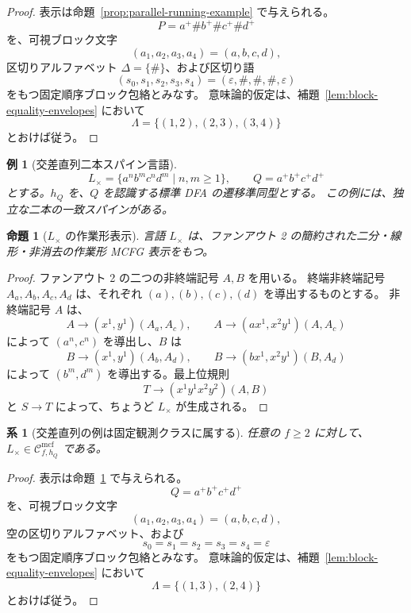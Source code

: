 \documentclass[11pt,a4paper]{ltjsarticle}
\newtheorem{proposition}[theorem]{命題}
\newtheorem{corollary}[theorem]{系}
\newtheorem{example}[theorem]{例}
\theoremstyle{remark}
\newcommand{\Cmcf}[2]{\mathcal{C}^{\mathrm{mcf}}_{#1,#2}}
\newcommand{\eps}{\varepsilon}
\begin{document}
\begin{proof}
表示は命題~\ref{prop:parallel-running-example} で与えられる。
\[
  P=a^+\#b^+\#c^+\#d^+
\]
を、可視ブロック文字
\[
  (a_1,a_2,a_3,a_4)=(a,b,c,d),
\]
区切りアルファベット \(\Delta=\{\#\}\)、および区切り語
\[
  (s_0,s_1,s_2,s_3,s_4)=(\eps,\#,\#,\#,\eps)
\]
をもつ固定順序ブロック包絡とみなす。
意味論的仮定は、補題~\ref{lem:block-equality-envelopes} において
\[
  \Lambda=\{(1,2),(2,3),(3,4)\}
\]
とおけば従う。
\end{proof}

\begin{example}[交差直列二本スパイン言語]
\label{ex:cross-serial-language}
\[
  L_{\times}=\{a^n b^m c^n d^m\mid n,m\ge1\},
  \qquad Q=a^+b^+c^+d^+
\]
とする。\(h_Q\) を、\(Q\) を認識する標準 DFA の遷移準同型とする。
この例には、独立な二本の一致スパインがある。
\end{example}

\begin{proposition}[\(L_{\times}\) の作業形表示]
\label{prop:cross-serial-running-example}
言語 \(L_{\times}\) は、ファンアウト 2 の簡約された二分・線形・非消去の作業形 MCFG 表示をもつ。
\end{proposition}

\begin{proof}
ファンアウト 2 の二つの非終端記号 \(A,B\) を用いる。
終端非終端記号 \(A_a,A_b,A_c,A_d\) は、それぞれ \((a),(b),(c),(d)\) を導出するものとする。
非終端記号 \(A\) は、
\[
  A\to(x^1,y^1)(A_a,A_c),
  \qquad
  A\to(a x^1,x^2 y^1)(A,A_c)
\]
によって \((a^n,c^n)\) を導出し、\(B\) は
\[
  B\to(x^1,y^1)(A_b,A_d),
  \qquad
  B\to(b x^1,x^2 y^1)(B,A_d)
\]
によって \((b^m,d^m)\) を導出する。最上位規則
\[
  T\to(x^1y^1x^2y^2)(A,B)
\]
と \(S\to T\) によって、ちょうど \(L_{\times}\) が生成される。
\end{proof}

\begin{corollary}[交差直列の例は固定観測クラスに属する]
\label{cor:cross-serial-in-fixed-observation-class}
任意の \(f\ge2\) に対して、\(L_{\times}\in\Cmcf{f}{h_Q}\) である。
\end{corollary}

\begin{proof}
表示は命題~\ref{prop:cross-serial-running-example} で与えられる。
\[
  Q=a^+b^+c^+d^+
\]
を、可視ブロック文字
\[
  (a_1,a_2,a_3,a_4)=(a,b,c,d),
\]
空の区切りアルファベット、および
\[
  s_0=s_1=s_2=s_3=s_4=\eps
\]
をもつ固定順序ブロック包絡とみなす。
意味論的仮定は、補題~\ref{lem:block-equality-envelopes} において
\[
  \Lambda=\{(1,3),(2,4)\}
\]
とおけば従う。
\end{proof}
\end{document}

